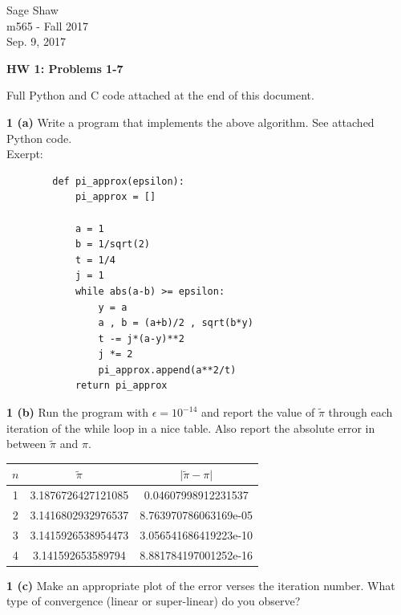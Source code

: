 \documentclass[12pt]{article}
\begin{document}
\thispagestyle{empty}
	
\begin{flushright}
Sage Shaw \\
m565 - Fall 2017 \\
Sep. 9, 2017
\end{flushright}
	
{\large \textbf{HW 1: Problems 1-7}}\bigbreak

	Full Python and C code attached at the end of this document. \bigbreak

\hspace{-7 ex}\textbf{1 (a)} Write a program that implements the above algorithm. \bigbreak
	See attached Python code. \\
	Exerpt:
	
	\begin{lstlisting}
		def pi_approx(epsilon):
			pi_approx = []
			
			a = 1
			b = 1/sqrt(2)
			t = 1/4
			j = 1
			while abs(a-b) >= epsilon:
				y = a
				a , b = (a+b)/2 , sqrt(b*y)
				t -= j*(a-y)**2
				j *= 2
				pi_approx.append(a**2/t)
			return pi_approx
	\end{lstlisting}
	
	\bigbreak
	
\hspace{-7 ex}\textbf{1 (b) } Run the program with $\epsilon = 10^{-14}$ and report the value of $\tilde{\pi}$ through each iteration of the
while loop in a nice table. Also report the absolute error in between $\tilde{\pi}$ and $\pi$. \bigbreak

	\begin{center}
		\begin{tabular}{|c|c|c|}
			\hline
			$n$ & $\tilde{\pi}$ & $\vert \tilde{\pi} - \pi \vert$ \\ \hline
			1 & 3.1876726427121085 & 0.04607998912231537 \\ \hline
			2 & 3.1416802932976537 & 8.763970786063169e-05 \\ \hline
			3 & 3.1415926538954473 & 3.056541686419223e-10 \\ \hline
			4 & 3.141592653589794 & 8.881784197001252e-16 \\ \hline
		\end{tabular}
	\end{center}
	

	
\hspace{-7 ex}\textbf{1 (c) } Make an appropriate plot of the error verses the iteration number. What type of convergence (linear or super-linear) do you observe? \bigbreak
\end{document}
